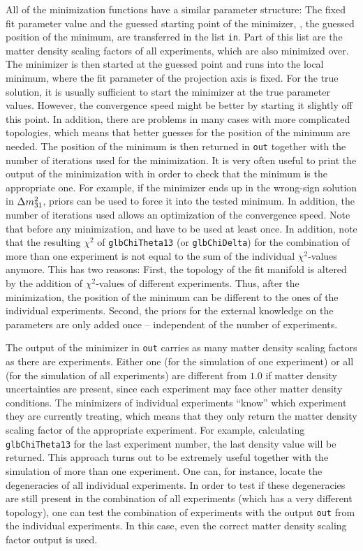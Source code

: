 All of the minimization functions have a similar parameter structure: The fixed fit parameter value and the guessed starting point of the minimizer, \ie, the guessed position of the minimum, are transferred in the list {\tt in}. Part of this list are the matter density
scaling factors of all experiments, which are also minimized over. 
The minimizer is then started at the guessed point and runs into
the local minimum, where the fit parameter of the projection
axis is fixed. For the true solution, it is usually sufficient to start 
the minimizer at the true parameter values. However, the convergence 
speed might
be better by starting it slightly off this point. In addition, there
are problems in many cases with more complicated topologies, which means
that better guesses for the position of the minimum are needed.
The position of the minimum is then returned in {\tt out}
together with the number of iterations used for the minimization.
It is very often useful to print the output of the minimization with
 in order to check that the minimum is the
appropriate one. For example, if the minimizer ends up in the wrong-sign
solution in $\Delta m_{31}^2$, priors can be used to force it into the tested
minimum. In addition, the number of iterations used allows an optimization
of the convergence speed. 
% 
Note that before any minimization,  
and  have to be used at least once. In addition, note that the resulting $\chi^2$ of {\tt glbChiTheta13} (or {\tt glbChiDelta}) for the combination of more than one experiment is not 
equal to the sum of the individual $\chi^2$-values anymore. This has two reasons: First, the topology of the fit manifold is altered by the addition of $\chi^2$-values of different experiments. Thus, after the minimization, the position of the minimum can be different to the ones of the individual experiments. Second, the priors for the external knowledge on the parameters are only added once -- independent of the number of experiments.

The output of the minimizer in {\tt out} carries as many matter density scaling factors as there are experiments. Either
one (for the simulation of one experiment) or all (for the simulation of
all experiments) are different from $1.0$ if matter density uncertainties
are present, since each experiment may face other matter density conditions. 
The minimizers of individual experiments ``know'' which
experiment they are currently treating, which means that they only return the
matter density scaling factor of the appropriate experiment.
For example, calculating {\tt glbChiTheta13} for the last experiment
number, the last density value will be returned.
This approach turns out to be extremely useful together with the
simulation of more than one experiment. One can, for instance, locate the
degeneracies of all individual experiments. In order to test if
these degeneracies are still present in the combination of all experiments (which has a very different topology), one can test the combination of experiments with the output {\tt out} from the individual experiments. In this case, even the correct matter density scaling factor
output is used. 

